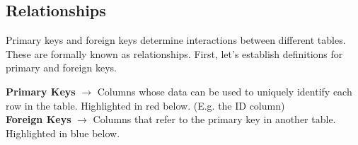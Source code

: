 \documentclass[english, 10pt]{article}
\begin{document}
\subsection{Relationships}

Primary keys and foreign keys determine interactions between different tables. These are formally known as relationships. First, let's establish definitions for primary and foreign keys.\\

\begin{tcolorbox}[title=Definition:,colframe=red!75!black,colback=red!5!white,arc=0pt,fonttitle=\bfseries]
\textbf{Primary Keys} $\rightarrow$ Columns whose data can be used to uniquely identify each row in the table. Highlighted in red below. (E.g. the ID column)\\
\textbf{Foreign Keys} $\rightarrow$ Columns that refer to the primary key in another table. Highlighted in blue below.
\end{tcolorbox}

\hfill \break 
\end{document}
